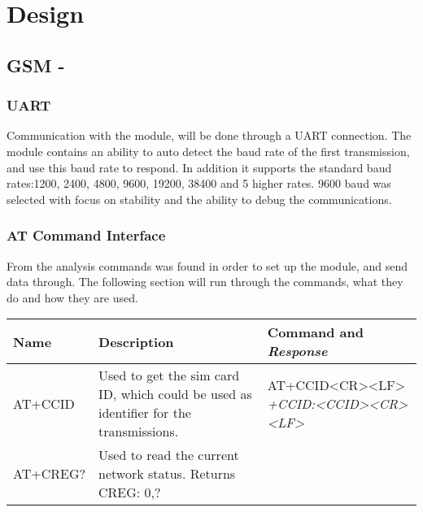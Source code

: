 
\chapter{Design}
\label{ch:Design}

\section{GSM - \SARA}

\subsection{UART}
Communication with the \SARA module, will be done through a UART connection. The module contains an ability to auto detect the baud rate of the first transmission, and use this baud rate to respond. In addition it supports the standard baud rates:\num{1200}, \num{2400}, \num{4800}, \num{9600}, \num{19200}, \num{38400} and 5 higher rates. \num{9600} baud was selected with focus on stability and the ability to debug the communications.

\subsection{AT Command Interface}
From the analysis commands was found in order to set up the module, and send data through. The following section will run through the commands, what they do and how they are used.

\begin{table}
	\setlength{\extrarowheight}{5pt}
	\begin{tabularx}{\textwidth}{p{3cm} X X}
		\toprule
		Name & Description & Command and \textit{Response} \\
		\midrule
		AT+CCID & Used to get the sim card ID, which could be used as identifier for the transmissions. & AT+CCID<CR><LF> \newline \newline
		\textit{+CCID:<CCID><CR><LF>} \\ 
		AT+CREG? & Used to read the current network status. Returns CREG: 0,? & \\
		\bottomrule
	\end{tabularx}
\end{table}

